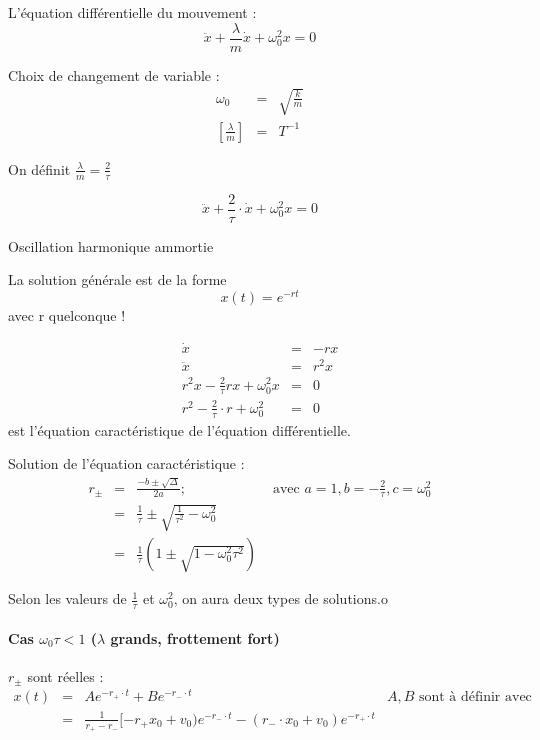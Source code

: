 	L'équation différentielle du mouvement : \[\ddot{x} + \frac{\lambda}{m} \dot{x} + \omega_0^2 x = 0\]

	Choix de changement de variable :
	\[\begin{array}{rcl}
			\omega_0 &=& \sqrt{\frac{k}{m}} \\
	{[\frac{\lambda}{m}]} &=& T^{-1}\end{array}\]

	On définit $\frac{\lambda}{m} = \frac{2}{\tau}$

	\[\ddot{x} + \frac{2}{\tau}\cdot \dot{x} + \omega_0^2 x = 0\]

	Oscillation harmonique ammortie

	La solution générale est de la forme \[x(t) = e^{-rt}\] avec r quelconque !

	\[\begin{array}{rcl}
			\dot{x} &=& -rx \\
			\ddot{x} &=& r^2 x \\
			r^2 x - \frac{2}{\tau} rx + \omega_0^2 x &=& 0\\
	r^2 - \frac{2}{\tau}\cdot r + \omega_0^2 &=& 0\end{array}\] est l'équation caractéristique de l'équation différentielle.

	Solution de l'équation caractéristique :
	\[\begin{array}{rclr}
		r_{\pm} &=& \frac{-b \pm \sqrt{\Delta}}{2a}; &  \text{ avec } a=1, b=-\frac{2}{\tau}, c = \omega_0^2 \\
							   &=& \frac{1}{\tau} \pm  \sqrt{\frac{1}{\tau^2} - \omega_0^2} \\
						 &=& \frac{1}{\tau}(1\pm\sqrt{1 - \omega_0^2 \tau^2})\end{array}\]

	Selon les valeurs de $\frac{1}{\tau}$ et $\omega_0^2$, on aura deux types de solutions.o
	\paragraph{Cas $\omega_0 \tau < 1$ ($\lambda$ grands, frottement fort)}

	$r_{\pm}$ sont réelles :
	\[\begin{array}{rccl}
			x(t) &=& Ae^{-r_+\cdot t} + Be^{-r_- \cdot t} & A, B\text{ sont à définir avec les conditions initiales }\\
			   &=& \frac{1}{r_+ - r_-} [-r_+ x_0 + v_0)e^{-r_- \cdot t} - (r_- \cdot x_0 + v_0)e^{-r_+ \cdot t}
	\end{array}\]

